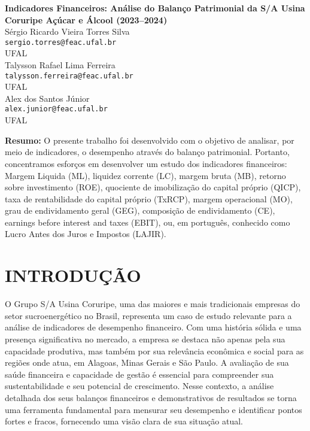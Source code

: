 \documentclass[1pt,a4paper]{article}
\begin{document}
	
	\begin{center}
		\LARGE \textbf{Indicadores Financeiros: Análise do Balanço Patrimonial da S/A Usina Coruripe Açúcar e Álcool (2023–2024)  
		 } \\[1cm]
		
		\large
		Sérgio Ricardo Vieira Torres Silva\\
		\texttt{sergio.torres@feac.ufal.br}\\
		UFAL\\[0.5cm]
		
		Talysson Rafael Lima Ferreira\\
		\texttt{talysson.ferreira@feac.ufal.br}\\
		UFAL\\[0.5cm]
		
		Alex dos Santos Júnior\\
		\texttt{alex.junior@feac.ufal.br}\\
		UFAL\\[0.5cm]
		
		
	\end{center}
	
	\vspace{1cm}
	
	\noindent \textbf{Resumo:} O presente trabalho foi desenvolvido com o objetivo de analisar, por meio de indicadores, o desempenho através do balanço patrimonial. Portanto, concentramos esforços em desenvolver um estudo dos indicadores financeiros: Margem Liquida (ML), liquidez corrente (LC), margem bruta (MB), retorno sobre investimento (ROE), quociente de imobilização do capital próprio (QICP), taxa de rentabilidade do capital próprio (TxRCP), margem operacional (MO), grau de endividamento geral (GEG), composição de endividamento (CE), earnings before interest and taxes (EBIT), ou, em português, conhecido como Lucro Antes dos Juros e Impostos (LAJIR).
	
	\section{INTRODUÇÃO}
	\setlength{\parindent}{1.5cm}
	
	\hspace*{1.5cm} O Grupo S/A Usina Coruripe, uma das maiores e mais tradicionais empresas do setor sucroenergético no Brasil, representa um caso de estudo relevante para a análise de indicadores de desempenho financeiro. Com uma história sólida e uma presença significativa no mercado, a empresa se destaca não apenas pela sua capacidade produtiva, mas também por sua relevância econômica e social para as regiões onde atua, em Alagoas, Minas Gerais e São Paulo. A avaliação de sua saúde financeira e capacidade de gestão é essencial para compreender sua sustentabilidade e seu potencial de crescimento. Nesse contexto, a análise detalhada dos seus balanços financeiros e demonstrativos de resultados se torna uma ferramenta fundamental para mensurar seu desempenho e identificar pontos fortes e fracos, fornecendo uma visão clara de sua situação atual.
	
\end{document}
